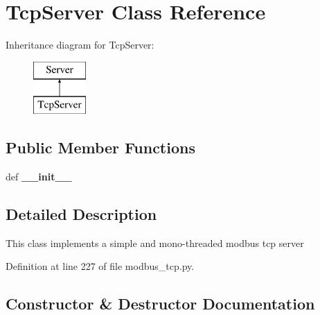 \section{Tcp\+Server Class Reference}
\label{classprotolibs_1_1modbus__tk_1_1modbus__tcp_1_1_tcp_server}
Inheritance diagram for Tcp\+Server\+:\begin{figure}[H]
\begin{center}
\leavevmode
\includegraphics[height=2.000000cm]{classprotolibs_1_1modbus__tk_1_1modbus__tcp_1_1_tcp_server}
\end{center}
\end{figure}
\subsection*{Public Member Functions}
\begin{DoxyCompactItemize}
\item 
def {\bf \+\_\+\+\_\+init\+\_\+\+\_\+}
\end{DoxyCompactItemize}


\subsection{Detailed Description}
\begin{DoxyVerb}This class implements a simple and mono-threaded modbus tcp server\end{DoxyVerb}
 

Definition at line 227 of file modbus\+\_\+tcp.\+py.



\subsection{Constructor \& Destructor Documentation}
